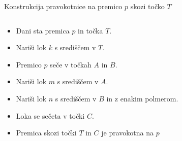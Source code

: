 \begin{frame}{Konstrukcija pravokotnice na premico $p$ skozi točko $T$}
	\begin{columns}
		\begin{column}{0.55\textwidth}
			\begin{itemize}
			\item<1->Dani sta premica $p$ in točka $T$.
			\item<2->Nariši lok $k$ s središčem v $T$.
			\item<3->Premico $p$ seče v točkah $A$ in $B$.
			\item<4->Nariši lok $m$ s središčem v $A$.
			\item<5->Nariši lok $n$ s središčem v $B$ in z enakim polmerom.
			\item<6->Loka se sečeta v točki $C$.
			\item<7->Premica skozi točki $T$ in $C$ je pravokotna na $p$
		  	\end{itemize}
		\end{column}
		\begin{column}{0.45\textwidth}
			\centering
\end{column}
\end{columns}
\end{frame}
